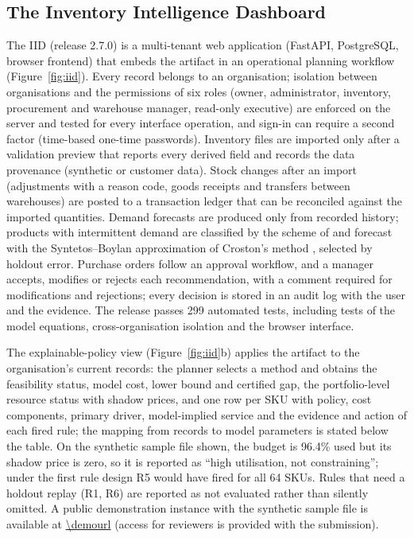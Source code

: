 \subsection{The Inventory Intelligence Dashboard}\label{sec:iid}
The IID (release 2.7.0) is a multi-tenant web application (FastAPI, PostgreSQL, browser frontend) that embeds the artifact in an operational planning workflow (Figure~\ref{fig:iid}). Every record belongs to an organisation; isolation between organisations and the permissions of six roles (owner, administrator, inventory, procurement and warehouse manager, read-only executive) are enforced on the server and tested for every interface operation, and sign-in can require a second factor (time-based one-time passwords). Inventory files are imported only after a validation preview that reports every derived field and records the data provenance (synthetic or customer data). Stock changes after an import (adjustments with a reason code, goods receipts and transfers between warehouses) are posted to a transaction ledger that can be reconciled against the imported quantities. Demand forecasts are produced only from recorded history; products with intermittent demand are classified by the scheme of \citet{SyntetosBoylanCroston2005} and forecast with the Syntetos--Boylan approximation \citep{SyntetosBoylan2005} of Croston's method \citep{Croston1972}, selected by holdout error. Purchase orders follow an approval workflow, and a manager accepts, modifies or rejects each recommendation, with a comment required for modifications and rejections; every decision is stored in an audit log with the user and the evidence. The release passes 299 automated tests, including tests of the model equations, cross-organisation isolation and the browser interface.

The explainable-policy view (Figure~\ref{fig:iid}b) applies the artifact to the organisation's current records: the planner selects a method and obtains the feasibility status, model cost, lower bound and certified gap, the portfolio-level resource status with shadow prices, and one row per SKU with policy, cost components, primary driver, model-implied service and the evidence and action of each fired rule; the mapping from records to model parameters is stated below the table. On the synthetic sample file shown, the budget is 96.4\% used but its shadow price is zero, so it is reported as ``high utilisation, not constraining''; under the first rule design R5 would have fired for all 64 SKUs. Rules that need a holdout replay (R1, R6) are reported as not evaluated rather than silently omitted. A public demonstration instance with the synthetic sample file is available at \url{\demourl} (access for reviewers is provided with the submission).

